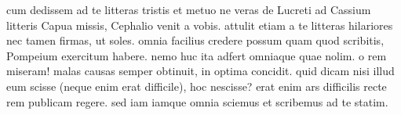 


 cum dedissem ad te litteras tristis et metuo ne veras de Lucreti ad Cassium litteris Capua missis, Cephalio venit a vobis. attulit etiam a te litteras hilariores nec tamen firmas, ut soles. omnia facilius credere possum quam quod scribitis, Pompeium exercitum habere. nemo huc ita adfert omniaque quae nolim. o rem miseram! malas causas semper obtinuit, in optima concidit. quid dicam nisi illud eum scisse (neque enim erat difficile), hoc nescisse? erat enim ars difficilis recte rem publicam regere. sed iam iamque omnia sciemus et scribemus ad te statim.
